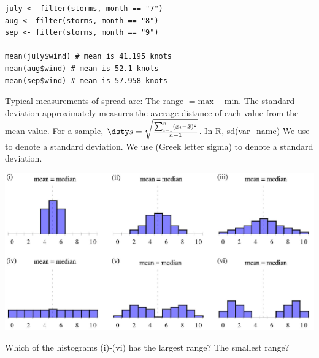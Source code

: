
\begin{lstlisting}
july <- filter(storms, month == "7")
aug <- filter(storms, month == "8")
sep <- filter(storms, month == "9")

mean(july$wind) # mean is 41.195 knots
mean(aug$wind) # mean is 52.1 knots
mean(sep$wind) # mean is 57.958 knots
\end{lstlisting}


\ee

\clearpage


\bbox
Typical measurements of spread are:
\bi
\ii The \alert{range} $= \mbox{max} - \mbox{min}$.
\ii The \alert{standard deviation} approximately measures the average distance of each value from the mean value. 
\bi
\ii[$\circ$] For a sample, $\dsty s = \sqrt{\frac{\sum_{i=1}^{n} (x_i - \bar{x})^2}{n-1}}$.
\ii[$\circ$] In R, \alert{sd(var\_name)}
\ii[$\circ$] We use   to denote a \textbf{} standard deviation.
\ii[$\circ$] We use  (Greek letter sigma) to denote a  \textbf{} standard deviation.
\ei
\ei
\ebox

\begin{center}
\includegraphics[width=0.75\tw]{02/fig-compare-sd.png}
\end{center}

\bb[resume]
\ii Which of the histograms (i)-(vi) has the largest range? The smallest range?


